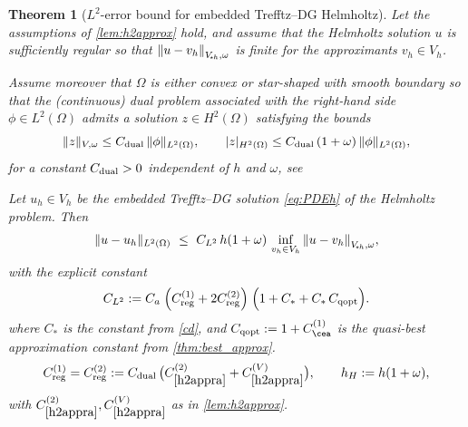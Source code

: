 \documentclass[11pt]{article}
\theoremstyle{definition}
\theoremstyle{plain}
\newtheorem{theorem}{Theorem}[section]
\newcommand{\Ca}{C_a}
\newcommand{\CD}{C_*}
\newcommand{\const}[1]{C_{\eqref{#1}}}
\newcommand{\Vsh}{V_{\!\star \hspace*{-0.2mm}h}}
\newcommand{\tdgonorm}[1]{{\Vert#1\Vert}_{\Vsh,\omega}}
\begin{document}
\begin{theorem}[$L^2$-error bound for embedded Trefftz--DG Helmholtz]\label{th:L2_helmholtz}
Let the assumptions of \cref{lem:h2approx} hold, and assume that the Helmholtz solution $u$ is sufficiently regular
so that $\tdgonorm{u-v_h}$ is finite for the approximants $v_h\in V_h$.

Assume moreover that $\Omega$ is either convex or star-shaped with smooth boundary so that the (continuous) dual problem
associated with the right-hand side $\phi\in L^2(\Omega)$ admits a solution $z\in H^2(\Omega)$ satisfying the bounds
\begin{equation}\label{eq:dual_reg_exp}
\|z\|_{V,\omega} \le C_{\rm dual}\,\|\phi\|_{L^2(\Omega)},
\qquad
|z|_{H^2(\Omega)} \le C_{\rm dual}\,(1+\omega)\,\|\phi\|_{L^2(\Omega)},
\end{equation}
for a constant $C_{\rm dual}>0$ independent of $h$ and $\omega$, see \cite[Proposition 8.1.4]{MM95}

Let $u_h\in V_h$ be the embedded Trefftz--DG solution \eqref{eq:PDEh} of the Helmholtz problem.
Then
\begin{equation}\label{eq:L2_helmholtz_bound}
\|u-u_h\|_{L^2(\Omega)}
\ \le\
C_{L^2}\,h(1+\omega)\,\inf_{v_h\in V_h}\tdgonorm{u-v_h},
\end{equation}
with the explicit constant
\begin{equation}\label{eq:CL2_def}
C_{L^2}
:=
\Ca\;\Bigl(C_{\rm reg}^{(1)}+2C_{\rm reg}^{(2)}\Bigr)\;
\Bigl(1+\CD+\CD\,C_{\rm qopt}\Bigr).
\end{equation}
where $\CD$ is the constant from \eqref{cd},
and $ C_{\rm qopt}:=1+C_{\cea}^{(1)} $ is the quasi-best approximation constant from \cref{thm:best_approx}.
\begin{equation}\label{eq:Creg_choice}
C_{\rm reg}^{(1)}=C_{\rm reg}^{(2)}
:= C_{\rm dual}\,\bigl(\const{h2appra}^{(2)}+\const{h2appra}^{(V)}\bigr),
\qquad
h_H:=h(1+\omega),
\end{equation}
with $\const{h2appra}^{(2)},\const{h2appra}^{(V)}$ as in \cref{lem:h2approx}.
\end{theorem}
\end{document}
